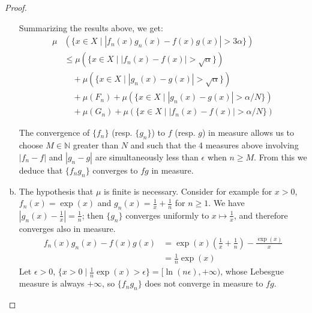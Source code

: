 \documentclass[11pt,a4paper,twoside]{article}
\theoremstyle{definition}
\begin{document}
\begin{proof}
\begin{enumerate}[(a)]
  Summarizing the results above, we get:
  \begin{equation*}
    \begin{split}
    \mu & \left( \big\{ x \in X \mid | f_n (x) g_n (x) - f (x) g (x) | > 3 \alpha \big\} \right) \\
    &\leq \mu \left( \big\{ x \in X \mid | f_n (x) - f (x) | > \sqrt{\alpha} \big\} \right) \\
    &\quad{}+ \mu \left( \big\{ x \in X \mid | g_n (x) - g (x) | > \sqrt{\alpha} \big\} \right) \\
    &\quad{}+ \mu (F_n) + \mu \left( \big\{ x \in X \mid | g_n (x) - g (x) | > \alpha / N \big\} \right) \\
    &\quad{}+ \mu (G_n) + \mu \left( \big\{ x \in X \mid | f_n (x) - f (x) | > \alpha / N \big\} \right)
    \end{split}
  \end{equation*}

  The convergence of $\{ f_n \}$ (resp. $\{ g_n \}$) to $f$ (resp. $g$) in measure allows us to choose $M \in \mathbb{N}$ greater than $N$ and such that
  the 4 measures above involving $| f_n - f |$ and $| g_n - g |$ are simultaneously less than $\epsilon$ when $n \geq M$. From this we deduce that $\{ f_n g_n \}$
  converges to $f g$ in measure.

  \item The hypothesis that $\mu$ is finite is necessary. Consider for example for $x > 0$, $f_n (x) = \exp (x)$ and $g_n (x) = \frac{1}{x} + \frac{1}{n}$ for $n \geq 1$.
    We have $| g_n (x) - \frac{1}{x} | = \frac{1}{n}$; then $\{ g_n \}$ converges uniformly to $x \mapsto \frac{1}{x}$, and therefore converges also in measure.
    \begin{align*}
      f_n (x) g_n (x) - f (x) g (x) &= \exp (x) \left( \frac{1}{x} + \frac{1}{n} \right) - \frac{\exp (x)}{x} \\
      &= \frac{1}{n} \exp (x)
    \end{align*}
    Let $\epsilon > 0$, $\{ x > 0 \mid \frac{1}{n} \exp (x) > \epsilon \} = {[\ln (n \epsilon), +\infty)}$, whose Lebesgue measure is always $+\infty$,
      so $\{ f_n g_n \}$ does not converge in measure to $f g$.\qedhere

  \end{enumerate}

\end{proof}
\end{document}
